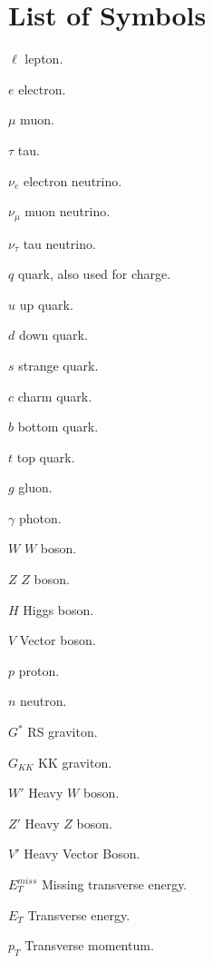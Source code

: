 \def\met{\ensuremath{E_{\mathrm{T}}^{\mathrm{miss}}}}


\chapter{List of Symbols}

\begin{symbollist}[0.7in]
    \item[$\ell$] lepton.
    \item[$e$] electron.
    \item[$\mu$] muon.
    \item[$\tau$] tau.
    \item[$\nu_{e}$] electron neutrino.
    \item[$\nu_{\mu}$] muon neutrino.
    \item[$\nu_{\tau}$] tau neutrino.
    \item[$q$] quark, also used for charge.
    \item[$u$] up quark.
    \item[$d$] down quark.
    \item[$s$] strange quark.
    \item[$c$] charm quark.
    \item[$b$] bottom quark.
    \item[$t$] top quark.
    \item[$g$] gluon.
    \item[$\gamma$] photon.
    \item[$W$] $W$ boson.
    \item[$Z$] $Z$ boson.
    \item[$H$] Higgs boson.
    \item[$V$] Vector boson.
    \item[$p$] proton.
    \item[$n$] neutron.
    \item[$G^*$] RS graviton.
    \item[$G_{KK}$] KK graviton.
    \item[$W'$] Heavy $W$ boson.
    \item[$Z'$] Heavy $Z$ boson.
    \item[$V'$] Heavy Vector Boson.
    \item[$E_T^{miss}$] Missing transverse energy.
    \item[$E_T$] Transverse energy.
    \item[$p_T$] Transverse momentum.

\end{symbollist}
